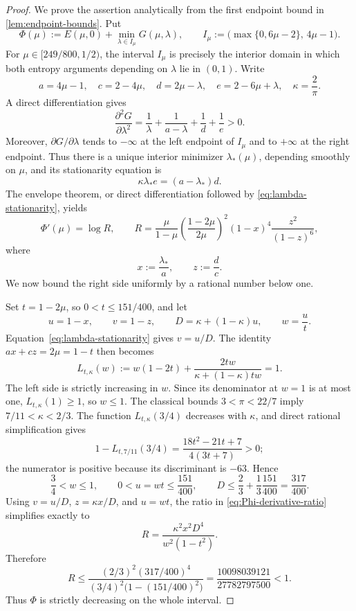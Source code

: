 \documentclass[11pt,letterpaper]{article}
\theoremstyle{definition}
\begin{document}
\begin{proof}
We prove the assertion analytically from the first endpoint bound in
\cref{lem:endpoint-bounds}.  Put
\[
  \Phi(\mu):=E(\mu,0)+\min_{\lambda\in I_\mu}G(\mu,\lambda),
  \qquad
  I_\mu:=\bigl(\max\{0,6\mu-2\},\,4\mu-1\bigr).
\]
For $\mu\in[249/800,1/2)$, the interval $I_\mu$ is precisely the interior domain in which both entropy arguments depending on $\lambda$ lie in $(0,1)$.  Write
\[
   a=4\mu-1,
   \quad c=2-4\mu,
   \quad d=2\mu-\lambda,
   \quad e=2-6\mu+\lambda,
   \quad \kappa=\frac2\pi.
\]
A direct differentiation gives
\[
   \frac{\partial^2G}{\partial\lambda^2}
    =\frac1\lambda+\frac1{a-\lambda}
      +\frac1d+\frac1e>0.
\]
Moreover, $\partial G/\partial\lambda$ tends to $-\infty$ at the left endpoint of $I_\mu$ and to $+\infty$ at the right endpoint.  Thus there is a unique interior minimizer $\lambda_*(\mu)$, depending smoothly on $\mu$, and its stationarity equation is
\begin{equation}
   \kappa\lambda_* e=(a-\lambda_*)d.
   \label{eq:lambda-stationarity}
\end{equation}
The envelope theorem, or direct differentiation followed by
\cref{eq:lambda-stationarity}, yields
\begin{equation}
  \Phi'(\mu)=\log R,
  \qquad
  R=\frac{\mu}{1-\mu}
       \left(\frac{1-2\mu}{2\mu}\right)^2
       (1-x)^4\frac{z^2}{(1-z)^6},
  \label{eq:Phi-derivative-ratio}
\end{equation}
where
\[
   x:=\frac{\lambda_*}{a},
   \qquad
   z:=\frac{d}{c}.
\]
We now bound the right side uniformly by a rational number below one.

Set $t=1-2\mu$, so $0<t\le151/400$, and let
\[
   u=1-x,
   \qquad v=1-z,
   \qquad D=\kappa+(1-\kappa)u,
   \qquad w=\frac ut.
\]
Equation~\eqref{eq:lambda-stationarity} gives $v=u/D$.  The identity
$ax+cz=2\mu=1-t$ then becomes
\begin{equation}
   L_{t,\kappa}(w):=
   w(1-2t)+\frac{2tw}{\kappa+(1-\kappa)tw}=1.
   \label{eq:Ltw}
\end{equation}
The left side is strictly increasing in $w$.  Since its denominator at $w=1$ is at most one,
$L_{t,\kappa}(1)\ge1$, so $w\le1$.  The classical bounds
$3<\pi<22/7$ imply $7/11<\kappa<2/3$.  The function
$L_{t,\kappa}(3/4)$ decreases with $\kappa$, and direct rational simplification gives
\[
  1-L_{t,7/11}(3/4)
   =\frac{18t^2-21t+7}{4(3t+7)}>0;
\]
the numerator is positive because its discriminant is $-63$.  Hence
\begin{equation}
   \frac34<w\le1,
   \qquad
   0<u=wt\le\frac{151}{400},
   \qquad
   D\le\frac23+\frac13\frac{151}{400}=\frac{317}{400}.
   \label{eq:wD-bounds}
\end{equation}
Using $v=u/D$, $z=\kappa x/D$, and $u=wt$, the ratio in
\cref{eq:Phi-derivative-ratio} simplifies exactly to
\[
   R=\frac{\kappa^2x^2D^4}{w^2(1-t^2)}.
\]
Therefore
\begin{equation}
   R\le
   \frac{(2/3)^2(317/400)^4}
        {(3/4)^2\bigl(1-(151/400)^2\bigr)}
   =\frac{10098039121}{27782797500}
   <1.
   \label{eq:global-R-bound}
\end{equation}
Thus $\Phi$ is strictly decreasing on the whole interval.


\end{proof}
\end{document}
